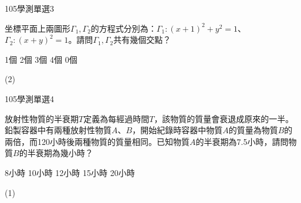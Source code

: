     \begin{QUESTION}
        \begin{ExamInfo}{105}{學測}{單選}{3}
        \end{ExamInfo}
        \begin{ExamAnsRateInfo}{54}{77}{53}{32}
        \end{ExamAnsRateInfo}
        \begin{QBODY}
            坐標平面上兩圖形${{\Gamma }_{1}},{{\Gamma }_{2}}$的方程式分別為：${{\Gamma }_{1}}:{{(x+1)}^{2}}+{{y}^{2}}=1$、${{\Gamma }_{2}}:{{(x+y)}^{2}}=1$。請問${{\Gamma }_{1}},{{\Gamma }_{2}}$共有幾個交點？
			\begin{QOPS}
				\QOP 1個	
				\QOP 2個	
				\QOP 3個	
				\QOP 4個	
				\QOP 0個
			\end{QOPS}
        \end{QBODY}
        \begin{QFROMS}
        \end{QFROMS}
        \begin{QTAGS}\end{QTAGS}
        \begin{QANS}
            (2)
        \end{QANS}
        \begin{QSOLLIST}
        \end{QSOLLIST}
        \begin{QEMPTYSPACE}
        \end{QEMPTYSPACE}
    \end{QUESTION}
    \begin{QUESTION}
        \begin{ExamInfo}{105}{學測}{單選}{4}
        \end{ExamInfo}
        \begin{ExamAnsRateInfo}{54}{91}{55}{16}
        \end{ExamAnsRateInfo}
        \begin{QBODY}
            放射性物質的半衰期$T$定義為每經過時間$T$，該物質的質量會衰退成原來的一半。鉛製容器中有兩種放射性物質$A$、$B$，開始紀錄時容器中物質$A$的質量為物質$B$的兩倍，而120小時後兩種物質的質量相同。已知物質$A$的半衰期為7.5小時，請問物質$B$的半衰期為幾小時？
			\begin{QOPS}
				\QOP 8小時	
				\QOP 10小時	
				\QOP 12小時	
				\QOP 15小時	
				\QOP 20小時
			\end{QOPS}
        \end{QBODY}
        \begin{QFROMS}
        \end{QFROMS}
        \begin{QTAGS}\end{QTAGS}
        \begin{QANS}
            (1)
        \end{QANS}
        \begin{QSOLLIST}
        \end{QSOLLIST}
        \begin{QEMPTYSPACE}
        \end{QEMPTYSPACE}
    \end{QUESTION}
